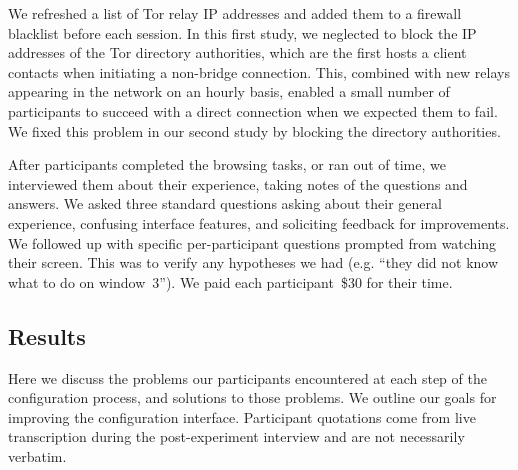 \documentclass[USenglish,oneside,twocolumn]{article}
\begin{document}
We refreshed a list of Tor relay IP addresses and added them
to a firewall blacklist before each session.
In this first study, we neglected to block the IP addresses
of the Tor directory authorities, which are the first hosts
a client contacts when initiating a non-bridge connection.
This, combined with new relays appearing in the network on an hourly basis,
enabled a small number of participants to succeed with
a direct connection when we expected them to fail.
We fixed this problem in our second study by blocking the directory authorities.

After participants completed the browsing tasks, or ran out of time,
we interviewed them about their experience,
taking notes of the questions and answers.
We asked three standard questions asking about their general experience, 
confusing interface features, and soliciting feedback for improvements. We followed up
with specific per-participant questions prompted from watching their screen. 
This was to verify any hypotheses we had (e.g. ``they did not know what to do on window~3'').
We paid each participant~\$30 for their time. 

\subsection{Results} 
Here we discuss the problems our participants encountered at each step of the configuration process, and solutions to those problems.
We outline our goals for improving the configuration interface.
Participant quotations come from live transcription during the post-experiment interview
and are not necessarily verbatim.
\end{document}
